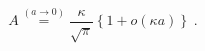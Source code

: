 \begin{equation}
A
\stackrel{(a \rightarrow 0)}{=}
\frac{\kappa}{\sqrt{\pi}}
\left\{
1 + 
o (\kappa a)
\right\}
\;  .
\label{eq:Acoeff_2D_ISP_circular_well}
\end{equation}

